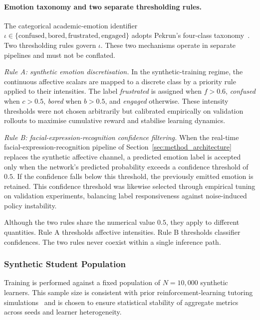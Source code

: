 \paragraph{Emotion taxonomy and two separate thresholding rules.}
The categorical academic-emotion identifier $\iota \in \{\text{confused}, \text{bored}, \text{frustrated}, \text{engaged}\}$ adopts Pekrun's four-class taxonomy~\cite{pekrun_control-value_2006}. Two thresholding rules govern $\iota$. These two mechanisms operate in separate pipelines and must not be conflated.

\textit{Rule A: synthetic emotion discretisation.} In the synthetic-training regime, the continuous affective scalars are mapped to a discrete class by a priority rule applied to their intensities. The label \emph{frustrated} is assigned when $f > 0.6$, \emph{confused} when $c > 0.5$, \emph{bored} when $b > 0.5$, and \emph{engaged} otherwise. These intensity thresholds were not chosen arbitrarily but calibrated empirically on validation rollouts to maximise cumulative reward and stabilise learning dynamics.

\textit{Rule B: facial-expression-recognition confidence filtering.} When the real-time facial-expression-recognition pipeline of Section~\ref{sec:method_architecture} replaces the synthetic affective channel, a predicted emotion label is accepted only when the network's predicted probability exceeds a confidence threshold of $0.5$. If the confidence falls below this threshold, the previously emitted emotion is retained. This confidence threshold was likewise selected through empirical tuning on validation experiments, balancing label responsiveness against noise-induced policy instability.

Although the two rules share the numerical value $0.5$, they apply to different quantities. Rule A thresholds affective intensities. Rule B thresholds classifier confidences. The two rules never coexist within a single inference path.

\subsubsection{Synthetic Student Population}\label{sec:method_synthetic_student}

Training is performed against a fixed population of $N = 10{,}000$ synthetic learners. This sample size is consistent with prior reinforcement-learning tutoring simulations~\cite{guzman_developing_2025,kong_real-time_2025,ramachandran_pomdp_2018} and is chosen to ensure statistical stability of aggregate metrics across seeds and learner heterogeneity.

